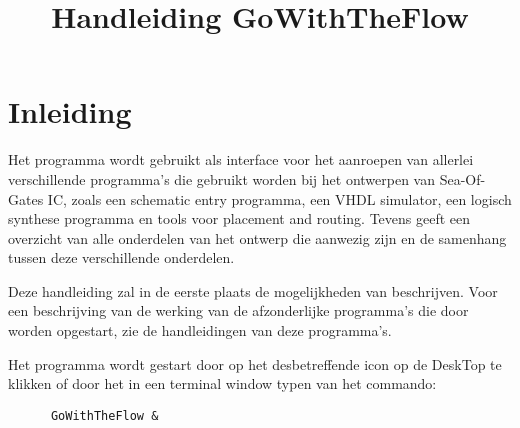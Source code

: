 \title{Handleiding GoWithTheFlow}
\maketitle

\section{Inleiding}
Het programma 
wordt gebruikt als interface voor het aanroepen
van allerlei verschillende programma's die gebruikt worden
bij het ontwerpen van Sea-Of-Gates IC,
zoals een schematic entry programma, een VHDL simulator,
een logisch synthese programma en
tools voor placement and routing.
Tevens geeft 
een overzicht van alle onderdelen van het ontwerp
die aanwezig zijn en de samenhang tussen deze verschillende onderdelen.

Deze handleiding zal in de eerste plaats 
de mogelijkheden van  beschrijven.
Voor een beschrijving van de werking van de afzonderlijke
programma's die door  worden opgestart, zie
de handleidingen van deze programma's.

Het programma  wordt gestart door op het desbetreffende icon
op de DeskTop te klikken of door het in een terminal window typen van het commando:
\begin{verbatim}
      GoWithTheFlow &
\end{verbatim}

